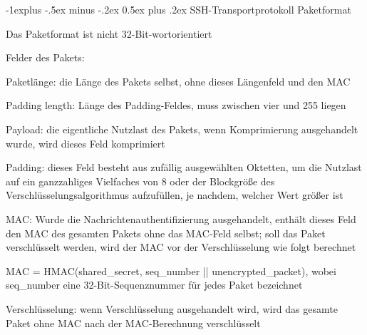 \documentclass[a4paper]{article}
\makeatletter
\renewcommand{\subsection}{\@startsection{subsection}{2}{0mm}%
 {-1explus -.5ex minus -.2ex}%
 {0.5ex plus .2ex}%
 {\normalfont\normalsize\bfseries}}
\makeatother
\begin{document}
\begin{multicols}{3}
      \subsection{SSH-Transportprotokoll Paketformat}
      \begin{itemize*}
            \item Das Paketformat ist nicht 32-Bit-wortorientiert
            \item Felder des Pakets:
            \begin{itemize*}
                  \item Paketlänge: die Länge des Pakets selbst, ohne dieses Längenfeld und den MAC
                  \item Padding length: Länge des Padding-Feldes, muss zwischen vier und 255 liegen
                  \item Payload: die eigentliche Nutzlast des Pakets, wenn Komprimierung ausgehandelt wurde, wird dieses Feld komprimiert
                  \item Padding: dieses Feld besteht aus zufällig ausgewählten Oktetten, um die Nutzlast auf ein ganzzahliges Vielfaches von 8 oder der Blockgröße des Verschlüsselungsalgorithmus aufzufüllen, je nachdem, welcher Wert größer ist
                  \item MAC: Wurde die Nachrichtenauthentifizierung ausgehandelt, enthält dieses Feld den MAC des gesamten Pakets ohne das MAC-Feld selbst; soll das Paket verschlüsselt werden, wird der MAC vor der Verschlüsselung wie folgt berechnet
                  \begin{itemize*}
                        \item MAC = HMAC(shared\_secret, seq\_number || unencrypted\_packet), wobei seq\_number eine 32-Bit-Sequenznummer für jedes Paket bezeichnet
                  \end{itemize*}
            \end{itemize*}
            \item Verschlüsselung: wenn Verschlüsselung ausgehandelt wird, wird das
            gesamte Paket ohne MAC nach der MAC-Berechnung verschlüsselt
      \end{itemize*}


\end{multicols}
\end{document}
